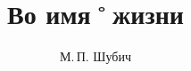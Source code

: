 ﻿%
\title{\huge Во имя˚жизни}										%
\author{\LARGE М.\,П. Шубич}											%

\maketitle																			%


%


\setcounter{page}{3}										%